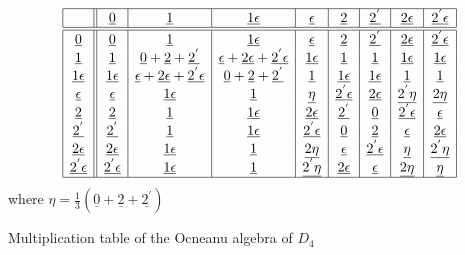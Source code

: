 \documentclass[a4paper,11pt]{article}
\newcommand{\ud}[1]{\underline{#1}}
\newcommand{\ep}{\epsilon}
\begin{document}
\begin{table}[hhh]
$$
\begin{array}{|c||c|c|c|c|c|c|c|c|}
\hline
{}   & \ud0 & \ud1 & \ud{1\ep} & \ud{\ep} & \ud{2} & \ud{2^{'}} &
\ud{2\ep} & \ud{2^{'}\ep} \\
\hline
\hline
\ud0 & \ud0 & \ud1 & \ud{1\ep} & \ud{\ep} & \ud{2} & \ud{2^{'}} &
\ud{2\ep} & \ud{2^{'}\ep} \\
\ud1 & \ud1 & \ud0 + \ud2 + \ud{2^{'}} & \ud{\ep} + \ud{2\ep} +
\ud{2^{'}\ep} & \ud{1\ep} & \ud1 &
            \ud1 & \ud{1\ep} & \ud{1\ep} \\
\ud{1\ep} & \ud{1\ep} & \ud{\ep} + \ud{2\ep} + \ud{2^{'}\ep} & \ud0 +
\ud2 + \ud{2^{'}} & \ud1 &
            \ud{1\ep} & \ud{1\ep} & \ud1 & \ud1 \\
\ud{\ep} & \ud{\ep} & \ud{1\ep} & \ud1 & \ud{\eta} & \ud{2^{'}\ep} &
\ud{2\ep} & \ud{2^{'}\eta} &
            \ud{2\eta} \\
\ud2 & \ud2 & \ud1 & \ud{1\ep} & \ud{2\ep} & \ud{2^{'}} & \ud0 &
\ud{2^{'}\ep} & \ud{\ep} \\
\ud{2^{'}} & \ud{2^{'}} & \ud1 & \ud{1\ep} & \ud{2^{'}\ep} & \ud0 &
\ud2 & \ud{\ep} & \ud{2\ep} \\
\ud{2\ep} & \ud{2\ep} & \ud{1\ep} & \ud1 & \ud{2\eta} & \ud{\ep} &
\ud{2^{'}\ep} & \ud{\eta} &
            \ud{2^{'}\eta} \\
\ud{2^{'}\ep} & \ud{2^{'}\ep} & \ud{1\ep} & \ud1 & \ud{2^{'}\eta} &
\ud{2\ep} & \ud{\ep} &
            \ud{2\eta} & \ud{\eta} \\
\hline
\end{array}
$$
\qquad \qquad \qquad where $\eta = \frac{1}{3} (\ud0 + \ud2 + \ud{2^{'}})$
\caption{Multiplication table of the Ocneanu algebra of $D_4$}
\label{multOcd4}
\end{table}

\end{document}

